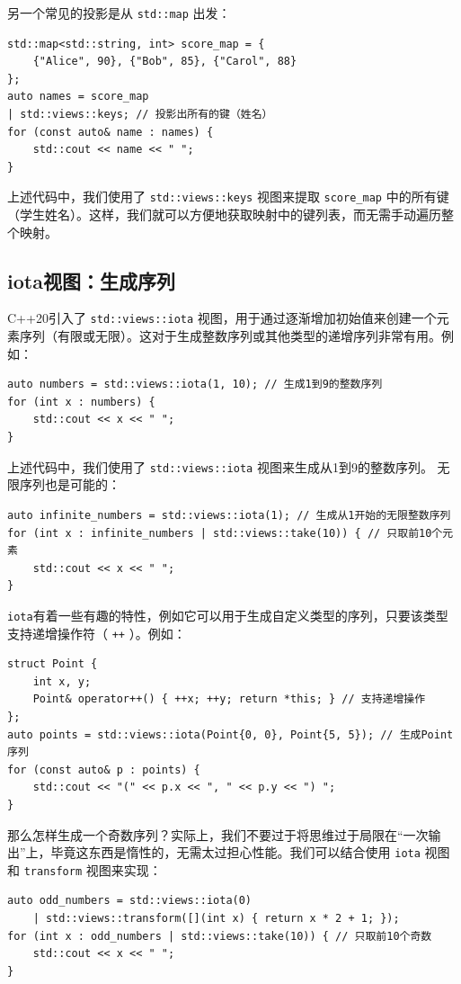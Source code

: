 另一个常见的投影是从 \verb|std::map| 出发：
\begin{verbatim}
std::map<std::string, int> score_map = {
    {"Alice", 90}, {"Bob", 85}, {"Carol", 88}
};
auto names = score_map
| std::views::keys; // 投影出所有的键（姓名）
for (const auto& name : names) {
    std::cout << name << " ";
}
\end{verbatim}
上述代码中，我们使用了 \verb|std::views::keys| 视图来提取 \verb|score_map| 中的所有键（学生姓名）。这样，我们就可以方便地获取映射中的键列表，而无需手动遍历整个映射。

\subsection{iota视图：生成序列}

C++20引入了 \verb|std::views::iota| 视图，用于通过逐渐增加初始值来创建一个元素序列（有限或无限）。这对于生成整数序列或其他类型的递增序列非常有用。例如：
\begin{verbatim}
auto numbers = std::views::iota(1, 10); // 生成1到9的整数序列
for (int x : numbers) {
    std::cout << x << " ";
}
\end{verbatim}
上述代码中，我们使用了 \verb|std::views::iota| 视图来生成从1到9的整数序列。
无限序列也是可能的：
\begin{verbatim}
auto infinite_numbers = std::views::iota(1); // 生成从1开始的无限整数序列
for (int x : infinite_numbers | std::views::take(10)) { // 只取前10个元素
    std::cout << x << " ";
}
\end{verbatim}

\verb|iota|有着一些有趣的特性，例如它可以用于生成自定义类型的序列，只要该类型支持递增操作符（ \verb|++| ）。例如：
\begin{verbatim}
struct Point {
    int x, y;
    Point& operator++() { ++x; ++y; return *this; } // 支持递增操作
};
auto points = std::views::iota(Point{0, 0}, Point{5, 5}); // 生成Point序列
for (const auto& p : points) {
    std::cout << "(" << p.x << ", " << p.y << ") ";
}
\end{verbatim}

那么怎样生成一个奇数序列？实际上，我们不要过于将思维过于局限在“一次输出”上，毕竟这东西是惰性的，无需太过担心性能。我们可以结合使用 \verb|iota| 视图和 \verb|transform| 视图来实现：
\begin{verbatim}
auto odd_numbers = std::views::iota(0)
    | std::views::transform([](int x) { return x * 2 + 1; });
for (int x : odd_numbers | std::views::take(10)) { // 只取前10个奇数
    std::cout << x << " ";
}
\end{verbatim}

